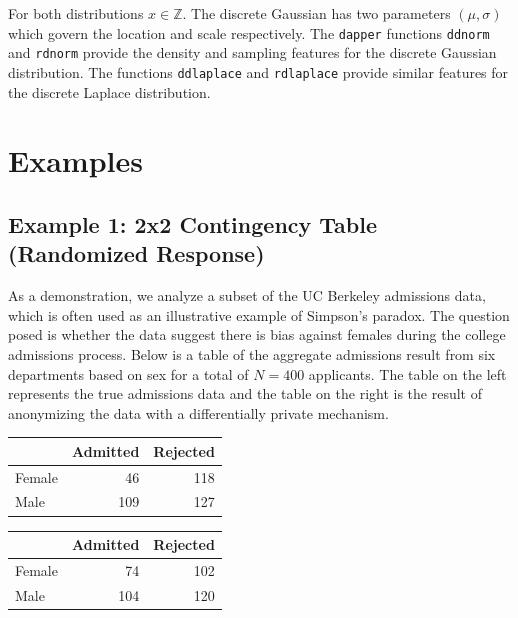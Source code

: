 For both distributions \(x \in \mathbb{Z}\). The discrete Gaussian has
two parameters \((\mu,\sigma)\) which govern the location and
scale respectively. The \texttt{dapper} functions \texttt{ddnorm} and \texttt{rdnorm} provide the
density and sampling features for the discrete Gaussian distribution. The functions
\texttt{ddlaplace} and \texttt{rdlaplace} provide similar features for the discrete Laplace distribution.

\hypertarget{examples}{%
\section{Examples}\label{examples}}

\hypertarget{example-1-2x2-contingency-table-randomized-response}{%
\subsection{Example 1: 2x2 Contingency Table (Randomized Response)}\label{example-1-2x2-contingency-table-randomized-response}}

As a demonstration, we analyze a subset of the UC Berkeley admissions data, which is often
used as an illustrative example of Simpson's paradox. The question posed is whether
the data suggest there is bias against females during the college admissions
process. Below is a table of the aggregate admissions result from six departments based on sex
for a total of \(N = 400\) applicants. The table on the left represents
the true admissions data and the table on the right is the result of anonymizing
the data with a differentially private mechanism.

\begin{table}[!h]
\centering
\centering
\begin{tabular}[t]{lrr}
\toprule
  & Admitted & Rejected\\
\midrule
Female & 46 & 118\\
Male & 109 & 127\\
\bottomrule
\end{tabular}
\centering
\begin{tabular}[t]{lrr}
\toprule
  & Admitted & Rejected\\
\midrule
Female & 74 & 102\\
Male & 104 & 120\\
\bottomrule
\end{tabular}
\end{table}

